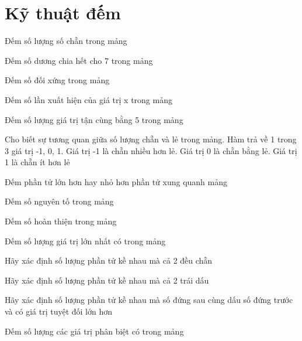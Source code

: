 \section{Kỹ thuật đếm}

\begin{problem}
    Đếm số lượng số chẵn trong mảng
\end{problem}
\begin{problem}
    Đếm số dương chia hết cho 7 trong mảng
\end{problem}
\begin{problem}
    Đếm số đối xứng trong mảng
\end{problem}
\begin{problem}
    Đếm số lần xuất hiện của giá trị x trong mảng
\end{problem}
\begin{problem}
    Đếm số lượng giá trị tận cùng bằng 5 trong mảng
\end{problem}
\begin{problem}
    Cho biết sự tương quan giữa số lượng chẵn và lẻ trong mảng. Hàm trả về 1 trong 3 giá trị -1, 0, 1. Giá trị -1 là chẵn nhiều hơn lẻ. Giá trị 0 là chẵn bằng lẻ. Giá trị 1 là chẵn ít hơn lẻ
\end{problem}
\begin{problem}
    Đếm phần tử lớn hơn hay nhỏ hơn phần tử xung quanh mảng
\end{problem}
\begin{problem}
    Đếm số nguyên tố trong mảng
\end{problem}
\begin{problem}
    Đếm số hoàn thiện trong mảng
\end{problem}
\begin{problem}
    Đếm số lượng giá trị lớn nhất có trong mảng
\end{problem}
\begin{problem}
    Hãy xác định số lượng phần tử kề nhau mà cả 2 đều chẵn
\end{problem}
\begin{problem}
    Hãy xác định số lượng phần tử kề nhau mà cả 2 trái dấu
\end{problem}
\begin{problem}
    Hãy xác định số lượng phần tử kề nhau mà số đứng sau cùng dấu số đứng trước và có giá trị tuyệt đối lớn hơn
\end{problem}
\begin{problem}
    Đếm số lượng các giá trị phân biệt có trong mảng
\end{problem}
